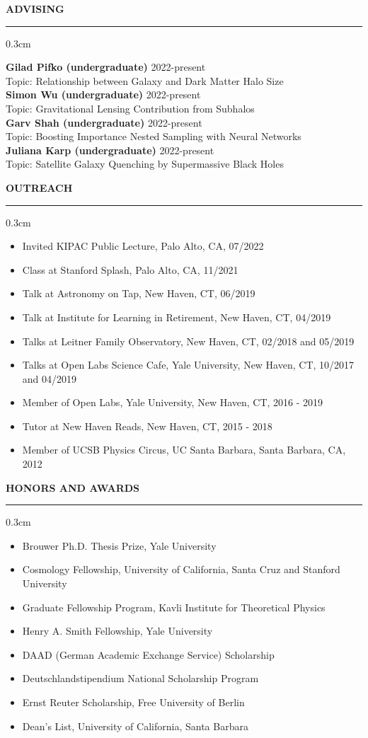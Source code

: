 \documentclass[12pt]{article}
\renewenvironment{section}[1]
  {
  \medskip
  {\color{yaleblue} \MakeUppercase{\bf #1}}
  \smallskip
  \hrule
  \medskip
  \begin{adjustwidth}{0.3cm}{}
  }
  {
  \end{adjustwidth}
  }
\newcommand{\entry}[3]{{\bf #1} \hfill {#2} \\ {#3}}
\begin{document}
\begin{section}{Advising}
  \entry{Gilad Pifko (undergraduate)}{2022-present}{Topic: Relationship between Galaxy and Dark Matter Halo Size} \medskip \\
  \entry{Simon Wu (undergraduate)}{2022-present}{Topic: Gravitational Lensing Contribution from Subhalos} \medskip \\
  \entry{Garv Shah (undergraduate)}{2022-present}{Topic: Boosting Importance Nested Sampling with Neural Networks} \medskip \\
  \entry{Juliana Karp (undergraduate)}{2022-present}{Topic: Satellite Galaxy Quenching by Supermassive Black Holes} \medskip
\end{section}

\begin{section}{Outreach}
  \begin{itemize}[leftmargin=0.5cm, topsep=0pt, itemsep=0pt, partopsep=0pt, parsep=0pt]
    \item Invited KIPAC Public Lecture, Palo Alto, CA, 07/2022
    \item Class at Stanford Splash, Palo Alto, CA, 11/2021
    \item Talk at Astronomy on Tap, New Haven, CT, 06/2019
    \item Talk at Institute for Learning in Retirement, New Haven, CT, 04/2019
    \item Talks at Leitner Family Observatory, New Haven, CT, 02/2018 and 05/2019
    \item Talks at Open Labs Science Cafe, Yale University, New Haven, CT, 10/2017 and 04/2019
    \item Member of Open Labs, Yale University, New Haven, CT, 2016 - 2019
    \item Tutor at New Haven Reads, New Haven, CT, 2015 - 2018
    \item Member of UCSB Physics Circus, UC Santa Barbara, Santa Barbara, CA, 2012
  \end{itemize}
\end{section}

\begin{section}{Honors and Awards}
  \begin{itemize}[leftmargin=0.5cm, topsep=0pt, itemsep=0pt, partopsep=0pt, parsep=0pt]
    \item Brouwer Ph.D. Thesis Prize, Yale University
    \item Cosmology Fellowship, University of California, Santa Cruz and Stanford University
    \item Graduate Fellowship Program, Kavli Institute for Theoretical Physics
    \item Henry A. Smith Fellowship, Yale University
    \item DAAD (German Academic Exchange Service) Scholarship
    \item Deutschlandstipendium National Scholarship Program
    \item Ernst Reuter Scholarship, Free University of Berlin
    \item Dean's List, University of California, Santa Barbara
  \end{itemize}
\end{section}
\end{document}
